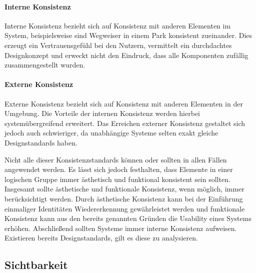 \paragraph{Interne Konsistenz}
Interne Konsistenz bezieht sich auf Konsistenz mit anderen Elementen im System, beispielsweise sind Wegweiser in einem Park konsistent zueinander.
Dies erzeugt ein Vertrauensgefühl bei den Nutzern, vermittelt ein durchdachtes Designkonzept und erweckt nicht den Eindruck, dass alle Komponenten zufällig zusammengestellt wurden.

\paragraph{Externe Konsistenz}
Externe Konsistenz bezieht sich auf Konsistenz mit anderen Elementen in der Umgebung. Die Vorteile der internen Konsistenz werden hierbei systemübergreifend erweitert. Das Erreichen externer Konsistenz gestaltet sich jedoch auch schwieriger, da unabhängige Systeme selten exakt gleiche Designstandards haben.

Nicht alle dieser Konsistenzstandards können oder sollten in allen Fällen angewendet werden. 
Es lässt sich jedoch festhalten, dass Elemente in einer logischen Gruppe immer ästhetisch und funktional konsistent sein sollten.
Insgesamt sollte ästhetische und funktionale Konsistenz, wenn möglich, immer berücksichtigt werden.
Durch ästhetische Konsistenz kann bei der Einführung einmaliger Identitäten Wiedererkennung gewährleistet werden und funktionale Konsistenz kann aus den bereits genannten Gründen die Usability eines Systems erhöhen.
Abschließend sollten Systeme immer interne Konsistenz aufweisen.
Existieren bereits Designstandards, gilt es diese zu analysieren.\cite{Lidwell.2010}

\subsection*{Sichtbarkeit}

